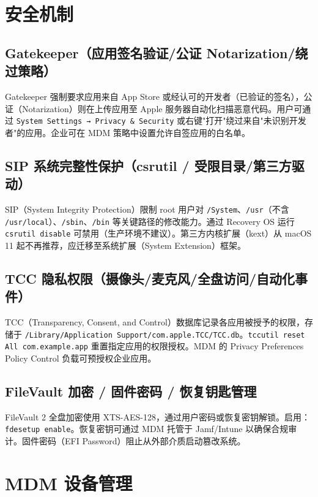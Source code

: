 \documentclass[12pt,UTF8]{ctexbook}
\begin{document}
  \section{安全机制}
    \subsection{Gatekeeper（应用签名验证/公证 Notarization/绕过策略）}

Gatekeeper 强制要求应用来自 App Store 或经认可的开发者（已验证的签名），公证（Notarization）则在上传应用至 Apple 服务器自动化扫描恶意代码。用户可通过 \verb|System Settings → Privacy & Security| 或右键"打开"绕过来自"未识别开发者"的应用。企业可在 MDM 策略中设置允许自签应用的白名单。

    \subsection{SIP 系统完整性保护（csrutil / 受限目录/第三方驱动）}

SIP（System Integrity Protection）限制 root 用户对 \verb|/System|、\verb|/usr|（不含 \verb|/usr/local|）、\verb|/sbin|、\verb|/bin| 等关键路径的修改能力。通过 Recovery OS 运行 \verb|csrutil disable| 可禁用（生产环境不建议）。第三方内核扩展（kext）从 macOS 11 起不再推荐，应迁移至系统扩展（System Extension）框架。

    \subsection{TCC 隐私权限（摄像头/麦克风/全盘访问/自动化事件）}

TCC（Transparency, Consent, and Control）数据库记录各应用被授予的权限，存储于 \verb|/Library/Application Support/com.apple.TCC/TCC.db|。\verb|tccutil reset All com.example.app| 重置指定应用的权限授权。MDM 的 Privacy Preferences Policy Control 负载可预授权企业应用。

    \subsection{FileVault 加密 / 固件密码 / 恢复钥匙管理}

FileVault 2 全盘加密使用 XTS-AES-128，通过用户密码或恢复密钥解锁。启用：\verb|fdesetup enable|。恢复密钥可通过 MDM 托管于 Jamf/Intune 以确保合规审计。固件密码（EFI Password）阻止从外部介质启动篡改系统。

  \section{MDM 设备管理}
\end{document}
